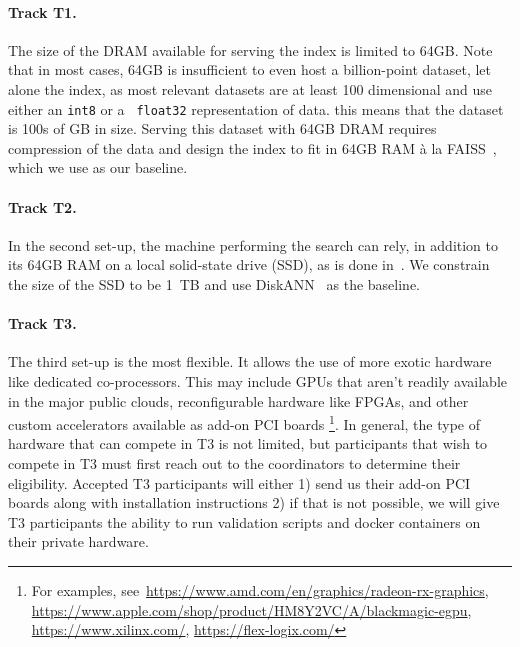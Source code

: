 \paragraph{Track T1.}

The size of the DRAM available for serving the index is limited to
64GB. Note that in most cases, 64GB is insufficient to even host a
billion-point dataset, let alone the index, as most relevant datasets
are at least 100 dimensional and use either an {\tt int8} or a {\tt
  float32} representation of data. this means that the dataset is 100s of GB in
size.  Serving this dataset with 64GB DRAM requires compression of the
data and design the index to fit in 64GB RAM \`a la
FAISS~\cite{Faiss17}, which we use as our baseline.

\paragraph{Track T2.}

In the second set-up, the machine performing the search can rely, in addition to its 64GB RAM on a local 
solid-state drive (SSD), as is done in~\cite{DiskANN19}. 
We constrain the size of the SSD to be 1~TB and use DiskANN~\cite{DiskANN19} as the baseline.


\paragraph{Track T3.}

The third set-up is the most flexible. It allows the use of more exotic 
hardware like dedicated co-processors. %
This may include GPUs that aren't readily available in the major public clouds, reconfigurable hardware like FPGAs, and other custom accelerators 
available as add-on PCI boards%
\footnote{For examples, see~\url{https://www.amd.com/en/graphics/radeon-rx-graphics},
\url{https://www.apple.com/shop/product/HM8Y2VC/A/blackmagic-egpu},
\url{https://www.xilinx.com/},
\url{https://flex-logix.com/}}.
In general, the type of hardware that can compete in T3 is not limited, but 
participants that wish to compete in T3 must first reach out to the coordinators to determine their eligibility.  Accepted T3 participants
will either 1) send us their add-on PCI boards along with installation instructions 2) if that is not possible, we will give
T3 participants the ability to run validation scripts and docker containers on their private hardware.  

